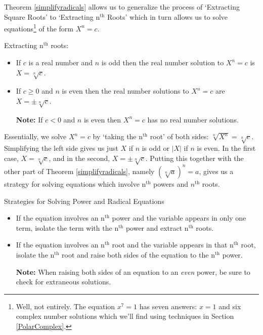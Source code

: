 Theorem \ref{simplifyradicals} allows us to generalize the process of `Extracting Square Roots' to `Extracting $\text{n}^{\text{th}}$ Roots' which in turn allows us to solve equations\footnote{Well, not entirely.  The equation $x^{7} = 1$ has seven answers: $x = 1$ and six complex number solutions which we'll find using techniques in Section \ref{PolarComplex}.} of the form $X^n  = c$.

\begin{floatbox}[label=box:extractingnthroots]{Extracting $\text{n}^{\text{th}}$ roots:}

\begin{itemize}[leftmargin=*]

\item If $c$ is a real number and $n$ is odd then the real number solution to $X^{n} = c$ is $X = \sqrt[n]{c}$.

\item  If $c \geq 0$ and $n$ is even then the real number solutions to $X^{n} = c$ are $X = \pm \sqrt[n]{c}$.

\textbf{Note:} If $c < 0$ and $n$ is even then $X^{n} = c$ has no real number solutions.

\end{itemize}

\end{floatbox}

Essentially, we solve $X^{n} = c$ by `taking the $\text{n}^{\text{th}}$ root' of both sides:  $\sqrt[n]{X^{n}} = \sqrt[n]{c}$. Simplifying the left side gives us just $X$ if $n$ is odd or $|X|$ if $n$ is even.  In the first case,  $X =  \sqrt[n]{c}$, and in the second, $X = \pm \sqrt[n]{c}$.  Putting this together with the other part of Theorem \ref{simplifyradicals}, namely $(\sqrt[n]{a})^n = a$, gives us a strategy for solving equations which involve $\text{n}^{\text{th}}$ powers and $n^{\text{th}}$ roots. 

\begin{floatbox}[label=box:solvepowerandradicaleqns]{Strategies for Solving Power and Radical Equations}

\begin{itemize}[leftmargin=*]

\item  If the equation involves an $\text{n}^{\text{th}}$ power and the variable appears in only one term, isolate the term with the $\text{n}^{\text{th}}$ power and extract $\text{n}^{\text{th}}$ roots.

\item  If the equation involves an $\text{n}^{\text{th}}$ root and the variable appears in that $\text{n}^{\text{th}}$ root, isolate the $\text{n}^{\text{th}}$ root and raise both sides of the equation to the $\text{n}^{\text{th}}$ power.

\textbf{Note:}  When raising both sides of an equation to an \textit{even} power, be sure to check for extraneous solutions.

\end{itemize}

\end{floatbox}

